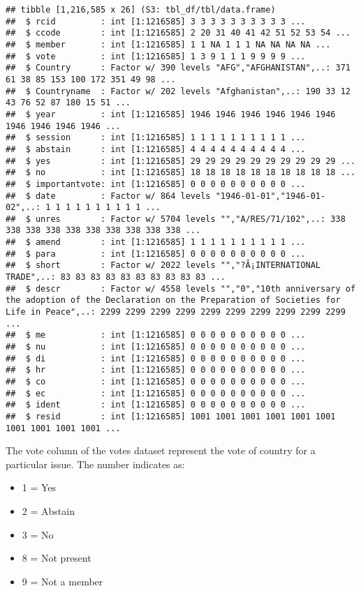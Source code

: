 \documentclass[
]{article}
\providecommand{\tightlist}{%
  \setlength{\itemsep}{0pt}\setlength{\parskip}{0pt}}
\begin{document}
\begin{verbatim}
## tibble [1,216,585 x 26] (S3: tbl_df/tbl/data.frame)
##  $ rcid         : int [1:1216585] 3 3 3 3 3 3 3 3 3 3 ...
##  $ ccode        : int [1:1216585] 2 20 31 40 41 42 51 52 53 54 ...
##  $ member       : int [1:1216585] 1 1 NA 1 1 1 NA NA NA NA ...
##  $ vote         : int [1:1216585] 1 3 9 1 1 1 9 9 9 9 ...
##  $ Country      : Factor w/ 390 levels "AFG","AFGHANISTAN",..: 371 61 38 85 153 100 172 351 49 98 ...
##  $ Countryname  : Factor w/ 202 levels "Afghanistan",..: 190 33 12 43 76 52 87 180 15 51 ...
##  $ year         : int [1:1216585] 1946 1946 1946 1946 1946 1946 1946 1946 1946 1946 ...
##  $ session      : int [1:1216585] 1 1 1 1 1 1 1 1 1 1 ...
##  $ abstain      : int [1:1216585] 4 4 4 4 4 4 4 4 4 4 ...
##  $ yes          : int [1:1216585] 29 29 29 29 29 29 29 29 29 29 ...
##  $ no           : int [1:1216585] 18 18 18 18 18 18 18 18 18 18 ...
##  $ importantvote: int [1:1216585] 0 0 0 0 0 0 0 0 0 0 ...
##  $ date         : Factor w/ 864 levels "1946-01-01","1946-01-02",..: 1 1 1 1 1 1 1 1 1 1 ...
##  $ unres        : Factor w/ 5704 levels "","A/RES/71/102",..: 338 338 338 338 338 338 338 338 338 338 ...
##  $ amend        : int [1:1216585] 1 1 1 1 1 1 1 1 1 1 ...
##  $ para         : int [1:1216585] 0 0 0 0 0 0 0 0 0 0 ...
##  $ short        : Factor w/ 2022 levels "","?Ã¡INTERNATIONAL TRADE",..: 83 83 83 83 83 83 83 83 83 83 ...
##  $ descr        : Factor w/ 4558 levels "","0","10th anniversary of the adoption of the Declaration on the Preparation of Societies for Life in Peace",..: 2299 2299 2299 2299 2299 2299 2299 2299 2299 2299 ...
##  $ me           : int [1:1216585] 0 0 0 0 0 0 0 0 0 0 ...
##  $ nu           : int [1:1216585] 0 0 0 0 0 0 0 0 0 0 ...
##  $ di           : int [1:1216585] 0 0 0 0 0 0 0 0 0 0 ...
##  $ hr           : int [1:1216585] 0 0 0 0 0 0 0 0 0 0 ...
##  $ co           : int [1:1216585] 0 0 0 0 0 0 0 0 0 0 ...
##  $ ec           : int [1:1216585] 0 0 0 0 0 0 0 0 0 0 ...
##  $ ident        : int [1:1216585] 0 0 0 0 0 0 0 0 0 0 ...
##  $ resid        : int [1:1216585] 1001 1001 1001 1001 1001 1001 1001 1001 1001 1001 ...
\end{verbatim}

The vote column of the votes dataset represent the vote of country for a
particular issue. The number indicates as:

\begin{itemize}
\tightlist
\item
  1 = Yes
\item
  2 = Abstain
\item
  3 = No
\item
  8 = Not present
\item
  9 = Not a member
\end{itemize}
\end{document}

